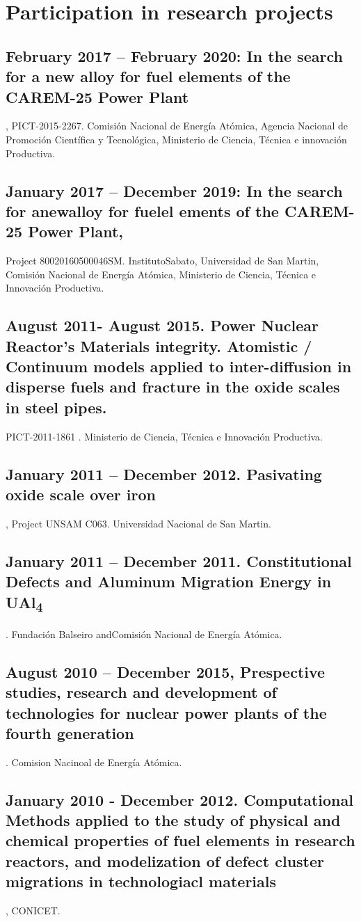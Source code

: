 \section{Participation in research projects}

\subsection{February 2017 – February 2020: In the search for a new alloy for fuel elements of the CAREM-25 Power Plant}, PICT-2015-2267. Comisión Nacional de Energía Atómica, Agencia Nacional de Promoción Científica y Tecnológica, Ministerio de Ciencia, Técnica e innovación Productiva.

\subsection{January 2017 – December 2019: In the search for anewalloy for fuelel ements of the CAREM-25 Power Plant, }Project 80020160500046SM. InstitutoSabato, Universidad de San Martin, Comisión Nacional de Energía Atómica, Ministerio de Ciencia, Técnica e Innovación Productiva.

\subsection{August 2011- August 2015. Power Nuclear Reactor’s Materials integrity. Atomistic / Continuum models applied to inter-diffusion in disperse fuels and fracture in the oxide scales in steel pipes.} PICT-2011-1861 . Ministerio de Ciencia, Técnica e Innovación Productiva. 

\subsection{January 2011 – December 2012. Pasivating oxide scale over iron}, Project UNSAM C063. Universidad Nacional de San Martin. 

 \subsection{January 2011 – December 2011. Constitutional Defects and Aluminum Migration Energy in UAl\textsubscript{4}}. Fundación Balseiro andComisión Nacional de Energía Atómica. 

\subsection{August 2010 – December 2015, Prespective studies, research and development of technologies for nuclear power plants of the fourth generation}. Comision Nacinoal de Energía Atómica.

 \subsection{January 2010 - December 2012. Computational Methods applied to the study of physical and chemical properties of fuel elements in research reactors, and modelization of defect cluster migrations in technologiacl materials}, CONICET.

